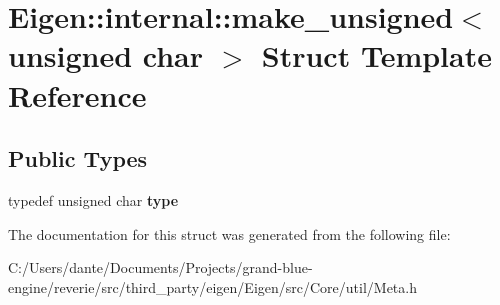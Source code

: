 \hypertarget{struct_eigen_1_1internal_1_1make__unsigned_3_01unsigned_01char_01_4}{}\section{Eigen\+::internal\+::make\+\_\+unsigned$<$ unsigned char $>$ Struct Template Reference}
\label{struct_eigen_1_1internal_1_1make__unsigned_3_01unsigned_01char_01_4}
\subsection*{Public Types}
\begin{DoxyCompactItemize}
\item 
\mbox{\label{struct_eigen_1_1internal_1_1make__unsigned_3_01unsigned_01char_01_4_ad1fa54b25b1258570d3ce34dbf23ef4b}} 
typedef unsigned char {\bfseries type}
\end{DoxyCompactItemize}


The documentation for this struct was generated from the following file\+:\begin{DoxyCompactItemize}
\item 
C\+:/\+Users/dante/\+Documents/\+Projects/grand-\/blue-\/engine/reverie/src/third\+\_\+party/eigen/\+Eigen/src/\+Core/util/Meta.\+h\end{DoxyCompactItemize}
